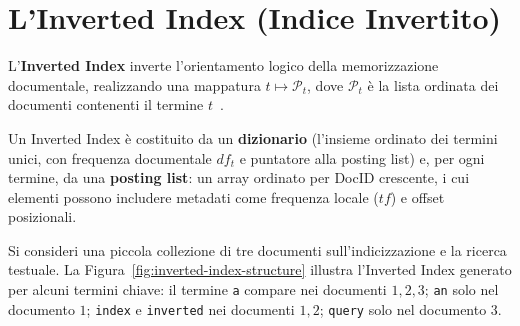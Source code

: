 \FloatBarrier
\section{L'Inverted Index (Indice Invertito)}

L'\textbf{Inverted Index} inverte l'orientamento logico della memorizzazione documentale, realizzando una mappatura $t \mapsto \mathcal{P}_t$, dove $\mathcal{P}_t$ \`e la lista ordinata dei documenti contenenti il termine $t$~\cite{manning2008}.

\begin{definition}
Un Inverted Index \`e costituito da un \textbf{dizionario} (l'insieme ordinato dei termini unici, con frequenza documentale $df_t$ e puntatore alla posting list) e, per ogni termine, da una \textbf{posting list}: un array ordinato per DocID crescente, i cui elementi possono includere metadati come frequenza locale ($tf$) e offset posizionali.
\end{definition}

\begin{example}
Si consideri una piccola collezione di tre documenti sull'indicizzazione e la ricerca testuale. La Figura~\ref{fig:inverted-index-structure} illustra l'Inverted Index generato per alcuni termini chiave: il termine \texttt{a} compare nei documenti $1,2,3$; \texttt{an} solo nel documento $1$; \texttt{index} e \texttt{inverted} nei documenti $1,2$; \texttt{query} solo nel documento $3$.
\end{example}

